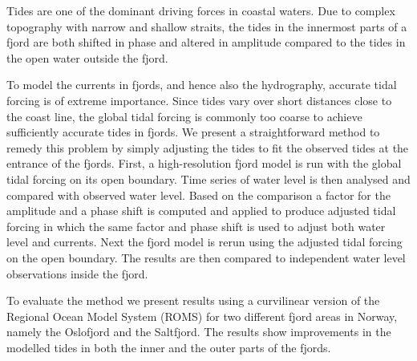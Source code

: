 \date{Received: date / Accepted: date}


\maketitle

Tides are one of the dominant driving forces in coastal waters. Due to complex topography with narrow and shallow straits, the tides in the innermost parts of a fjord are both shifted in phase and altered in amplitude compared to the tides in the open water outside the fjord.

To model the currents in fjords, and hence also the hydrography, accurate tidal forcing is of extreme importance. Since tides vary over short distances close to the coast line, the global tidal forcing is commonly too coarse to achieve sufficiently accurate tides in fjords. We present a straightforward method to remedy this problem by simply adjusting the tides to fit the observed tides at the entrance of the fjords. First, a high-resolution fjord model is run with the global tidal forcing on its open boundary. Time series of water level is then analysed and compared with observed water level. Based on the comparison a factor for the amplitude and a phase shift is computed and applied to produce adjusted tidal forcing in which the same factor and phase shift is used to adjust both water level and currents. Next the fjord model is rerun using the adjusted tidal forcing on the open boundary. The results are then compared to independent water level observations inside the fjord.  

To evaluate the method we present results using a curvilinear version of the Regional Ocean Model System (ROMS) for two different fjord areas in Norway, namely the Oslofjord and the Saltfjord. The results show improvements in the modelled tides in both the inner and the outer parts of the fjords. 

%











